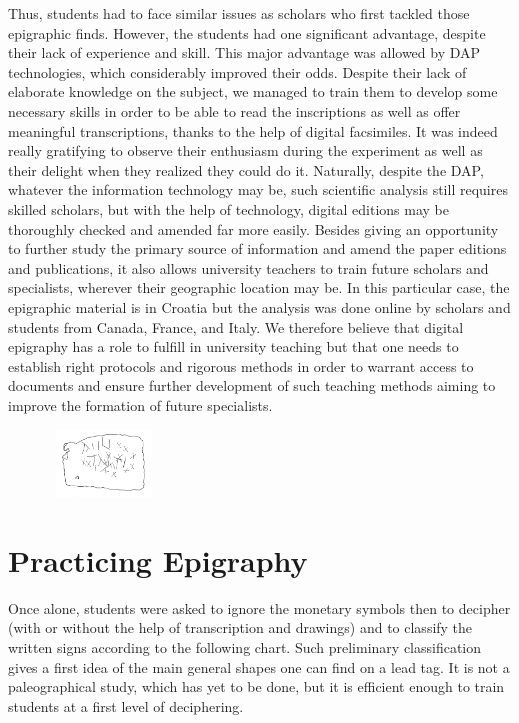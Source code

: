\documentclass[amsthm,ebook]{saparticle}
\begin{document}
Thus, students had to face similar issues as scholars who first tackled those epigraphic finds. However, the students
had one significant advantage, despite their lack of experience and skill. This major advantage was allowed by DAP
technologies, which considerably improved their odds. Despite their lack of elaborate knowledge on the subject, we
managed to train them to develop some necessary skills in order to be able to read the inscriptions as well as offer
meaningful transcriptions, thanks to the help of digital facsimiles. It was indeed really gratifying to observe their
enthusiasm during the experiment as well as their delight when they realized they could do it. Naturally, despite the
DAP, whatever the information technology may be, such scientific analysis still requires skilled scholars, but with the
help of technology, digital editions may be thoroughly checked and amended far more easily. Besides giving an
opportunity to further study the primary source of information and amend the paper editions and publications, it also
allows university teachers to train future scholars and specialists, wherever their geographic location may be. In this
particular case, the epigraphic material is in Croatia but the analysis was done online by scholars and students from
Canada, France, and Italy. We therefore believe that digital epigraphy has a role to fulfill in university teaching but
that one needs to establish right protocols and rigorous methods in order to warrant access to documents and ensure
further development of such teaching methods aiming to improve the formation of future specialists.

\begin{figure}
\centering
\includegraphics[width=2.965cm,height=1.79cm]{EAGLE16lameetalteaching-img006.png}
\end{figure}

\section{Practicing Epigraphy}


\noindent Once alone, students were asked to ignore the monetary symbols then to decipher (with or without the help of
transcription and drawings) and to classify the written signs according to the following chart. Such preliminary
classification gives a first idea of the main general shapes one can find on a lead tag. It is not a paleographical
study, which has yet to be done, but it is efficient enough to train students at a first level of deciphering.
\end{document}
